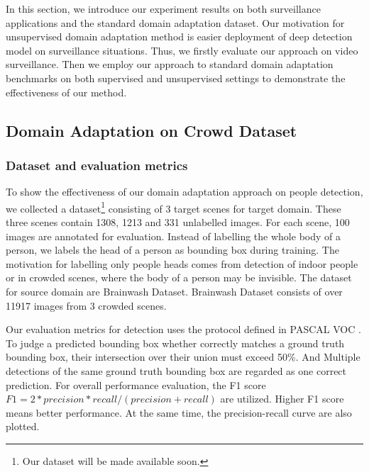 \documentclass[runningheads]{llncs}
\begin{document}
In this section, we introduce our experiment results on both surveillance applications and the standard domain adaptation dataset. Our motivation for unsupervised domain adaptation method is easier deployment of deep detection model on surveillance situations. Thus, we firstly evaluate our approach on video surveillance. Then we employ our approach to standard domain adaptation benchmarks on both supervised and unsupervised settings to demonstrate the effectiveness of our method.

\subsection{Domain Adaptation on Crowd Dataset}

\subsubsection{Dataset and evaluation metrics}
To show the effectiveness of our domain adaptation approach on people detection, we collected a dataset\footnote{Our dataset will be made available soon.} consisting of 3 target scenes for target domain. These three scenes contain 1308, 1213 and 331 unlabelled images. For each scene, 100 images are annotated for evaluation. Instead of labelling the whole body of a person, we labels the head of a person as bounding box during training. The motivation for labelling only people heads comes from detection of indoor people or in crowded scenes, where the body of a person may be invisible. The dataset for source domain are Brainwash Dataset\cite{stewart2015end}. Brainwash Dataset consists of over 11917 images from 3 crowded scenes.

Our evaluation metrics for detection uses the protocol defined in PASCAL VOC \cite{everingham2015pascal}. To judge a predicted bounding box whether correctly matches a ground truth bounding box, their intersection over their union must exceed 50\%. And Multiple detections of the same ground truth bounding box are regarded as one correct prediction. For overall performance evaluation, the F1 score $F1 = 2*precision*recall/(precision+recall)$ are utilized. Higher F1 score means better performance. At the same time, the precision-recall curve are also plotted.
\end{document}
